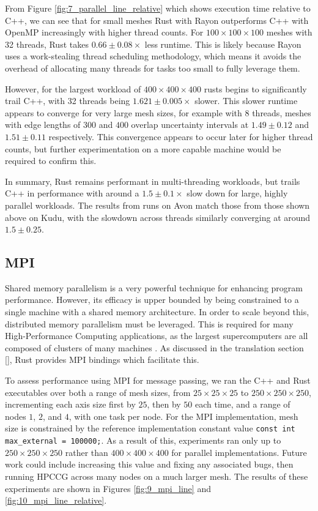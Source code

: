 From Figure \ref{fig:7_parallel_line_relative} which shows execution time relative to C++, we can see that for small meshes Rust with Rayon outperforms C++ with OpenMP increasingly with higher thread counts. For $100 \times 100 \times 100$ meshes with 32 threads, Rust takes $0.66 \pm 0.08 \times$ less runtime. This is likely because Rayon uses a work-stealing thread scheduling methodology, which means it avoids the overhead of allocating many threads for tasks too small to fully leverage them.

However, for the largest workload of $400 \times 400 \times 400$ rusts begins to significantly trail C++, with 32 threads being $1.621 \pm 0.005 \times$ slower. This slower runtime appears to converge for very large mesh sizes, for example with 8 threads, meshes with edge lengths of $300$ and $400$ overlap uncertainty intervals at $1.49 \pm 0.12$ and $1.51 \pm 0.11$ respectively. This convergence appears to occur later for higher thread counts, but further experimentation on a more capable machine would be required to confirm this.

In summary, Rust remains performant in multi-threading workloads, but trails C++ in performance with around a $1.5 \pm 0.1\times$ slow down for large, highly parallel workloads. The results from runs on Avon match those from those shown above on Kudu, with the slowdown across threads similarly converging at around $1.5 \pm 0.25$.

\subsection{MPI}
\label{ssec:mpi}

Shared memory parallelism is a very powerful technique for enhancing program performance. However, its efficacy is upper bounded by being constrained to a single machine with a shared memory architecture. In order to scale beyond this, distributed memory parallelism must be leveraged. This is required for many High-Performance Computing applications, as the largest supercomputers are all composed of clusters of many machines \cite{HomeTOP500}. As discussed in the translation section \ref{}, Rust provides MPI bindings which facilitate this.

To assess performance using MPI for message passing, we ran the C++ and Rust executables over both a range of mesh sizes, from $25 \times 25 \times 25$ to $250 \times 250 \times 250$, incrementing each axis size first by $25$, then by $50$ each time, and a range of nodes $1$, $2$, and $4$, with one task per node. For the MPI implementation, mesh size is constrained by the reference implementation constant value \texttt{const int max_external = 100000;}. As a result of this, experiments ran only up to $250 \times 250 \times 250$ rather than $400 \times 400 \times 400$ for parallel implementations. Future work could include increasing this value and fixing any associated bugs, then running HPCCG across many nodes on a much larger mesh. 
The results of these experiments are shown in Figures \ref{fig:9_mpi_line} and \ref{fig:10_mpi_line_relative}.

